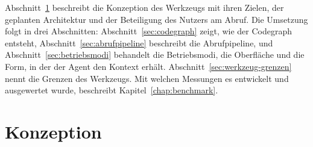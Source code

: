 Abschnitt~\ref{sec:konzeption} beschreibt die Konzeption des Werkzeugs mit ihren Zielen, der geplanten Architektur und der Beteiligung des Nutzers am Abruf. Die Umsetzung folgt in drei Abschnitten: Abschnitt~\ref{sec:codegraph} zeigt, wie der Codegraph entsteht, Abschnitt~\ref{sec:abrufpipeline} beschreibt die Abrufpipeline, und Abschnitt~\ref{sec:betriebsmodi} behandelt die Betriebsmodi, die Oberfläche und die Form, in der der Agent den Kontext erhält. Abschnitt~\ref{sec:werkzeug-grenzen} nennt die Grenzen des Werkzeugs. Mit welchen Messungen es entwickelt und ausgewertet wurde, beschreibt Kapitel~\ref{chap:benchmark}.

\section{Konzeption}%
\label{sec:konzeption}
